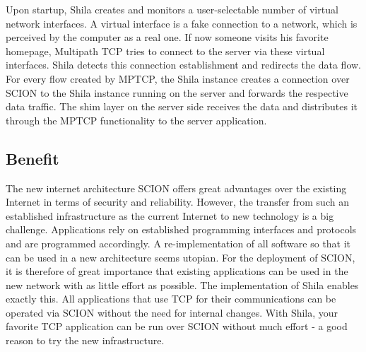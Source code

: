 Upon startup, Shila creates and monitors a user-selectable number of virtual network interfaces. A virtual interface is a fake connection to a network, which is perceived by the computer as a real one. If now someone visits his favorite homepage, Multipath TCP tries to connect to the server via these virtual interfaces. Shila detects this connection establishment and redirects the data flow.  For every flow created by MPTCP, the Shila instance creates a connection over SCION to the Shila instance running on the server and forwards the respective data traffic. The shim layer on the server side receives the data and distributes it through the MPTCP functionality to the server application.

\subsection*{Benefit}

The new internet architecture SCION offers great advantages over the existing Internet in terms of security and reliability. However, the transfer from such an established infrastructure as the current Internet to new technology is a big challenge. Applications rely on established programming interfaces and protocols and are programmed accordingly. A re-implementation of all software so that it can be used in a new architecture seems utopian. For the deployment of SCION, it is therefore of great importance that existing applications can be used in the new network with as little effort as possible. The implementation of Shila enables exactly this. All applications that use TCP for their communications can be operated via SCION without the need for internal changes. With Shila, your favorite TCP application can be run over SCION without much effort - a good reason to try the new infrastructure.

